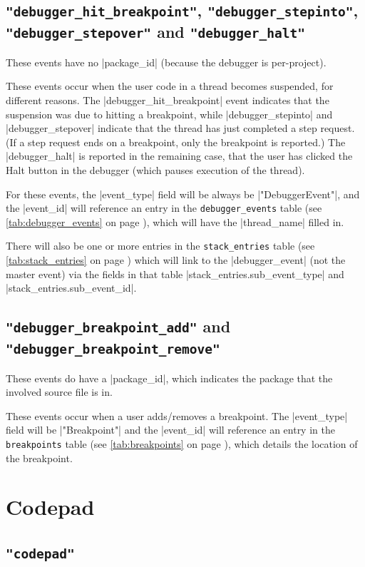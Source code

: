 \documentclass{report}
\newcommand{\myref}[1]{\autoref{#1} on page \pageref*{#1}}
\newcommand{\tabref}[1]{\lstinline|#1| table (see \myref{tab:#1})}
\begin{document}
\subsection{\lstinline!"debugger_hit_breakpoint"!, \lstinline!"debugger_stepinto"!,\\ \lstinline!"debugger_stepover"! and \lstinline!"debugger_halt"!}

These events have no |package_id| (because the debugger is per-project).

These events occur when the user code in a thread becomes suspended, for
different reasons.  The
|debugger_hit_breakpoint| event indicates that the suspension was due to
hitting a breakpoint, while |debugger_stepinto| and |debugger_stepover|
indicate that the thread has just completed a step request.  (If a step
request ends on a breakpoint, only the breakpoint is reported.)  The
|debugger_halt| is reported in the remaining case, that the user has
clicked the Halt button in the debugger (which pauses execution of the thread).

For these events, the |event_type| field will be always be |"DebuggerEvent"|,
and the |event_id| will reference an entry in the \tabref{debugger_events},
which will have the |thread_name| filled in.

There will also be one or more entries in the \tabref{stack_entries} which
will link to the |debugger_event| (not the master event) via the fields in
that table
|stack_entries.sub_event_type| and |stack_entries.sub_event_id|.

\subsection{\lstinline!"debugger_breakpoint_add"! and \lstinline!"debugger_breakpoint_remove"!}

These events do have a |package_id|, which indicates the package that the
involved source file is in.

These events occur when a user adds/removes a breakpoint.  The |event_type|
field will be |"Breakpoint"| and the |event_id| will reference an entry in
the \tabref{breakpoints}, which details the location of the breakpoint.


\section{Codepad}

\subsection{\lstinline!"codepad"!}
\end{document}
